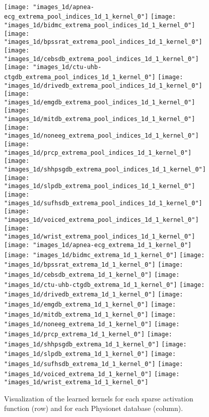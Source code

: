 \documentclass[journal]{IEEEtran}
\begin{document}
\begin{figure*}[!t]
	\\
	\texttt{[image: "images\_1d/apnea-ecg\_extrema\_pool\_indices\_1d\_1\_kernel\_0"]}
	\texttt{[image: "images\_1d/bidmc\_extrema\_pool\_indices\_1d\_1\_kernel\_0"]}
	\texttt{[image: "images\_1d/bpssrat\_extrema\_pool\_indices\_1d\_1\_kernel\_0"]}
	\texttt{[image: "images\_1d/cebsdb\_extrema\_pool\_indices\_1d\_1\_kernel\_0"]}
	\texttt{[image: "images\_1d/ctu-uhb-ctgdb\_extrema\_pool\_indices\_1d\_1\_kernel\_0"]}
	\texttt{[image: "images\_1d/drivedb\_extrema\_pool\_indices\_1d\_1\_kernel\_0"]}
	\texttt{[image: "images\_1d/emgdb\_extrema\_pool\_indices\_1d\_1\_kernel\_0"]}
	\texttt{[image: "images\_1d/mitdb\_extrema\_pool\_indices\_1d\_1\_kernel\_0"]}
	\texttt{[image: "images\_1d/noneeg\_extrema\_pool\_indices\_1d\_1\_kernel\_0"]}
	\texttt{[image: "images\_1d/prcp\_extrema\_pool\_indices\_1d\_1\_kernel\_0"]}
	\texttt{[image: "images\_1d/shhpsgdb\_extrema\_pool\_indices\_1d\_1\_kernel\_0"]}
	\texttt{[image: "images\_1d/slpdb\_extrema\_pool\_indices\_1d\_1\_kernel\_0"]}
	\texttt{[image: "images\_1d/sufhsdb\_extrema\_pool\_indices\_1d\_1\_kernel\_0"]}
	\texttt{[image: "images\_1d/voiced\_extrema\_pool\_indices\_1d\_1\_kernel\_0"]}
	\texttt{[image: "images\_1d/wrist\_extrema\_pool\_indices\_1d\_1\_kernel\_0"]}
	\\
	\texttt{[image: "images\_1d/apnea-ecg\_extrema\_1d\_1\_kernel\_0"]}
	\texttt{[image: "images\_1d/bidmc\_extrema\_1d\_1\_kernel\_0"]}
	\texttt{[image: "images\_1d/bpssrat\_extrema\_1d\_1\_kernel\_0"]}
	\texttt{[image: "images\_1d/cebsdb\_extrema\_1d\_1\_kernel\_0"]}
	\texttt{[image: "images\_1d/ctu-uhb-ctgdb\_extrema\_1d\_1\_kernel\_0"]}
	\texttt{[image: "images\_1d/drivedb\_extrema\_1d\_1\_kernel\_0"]}
	\texttt{[image: "images\_1d/emgdb\_extrema\_1d\_1\_kernel\_0"]}
	\texttt{[image: "images\_1d/mitdb\_extrema\_1d\_1\_kernel\_0"]}
	\texttt{[image: "images\_1d/noneeg\_extrema\_1d\_1\_kernel\_0"]}
	\texttt{[image: "images\_1d/prcp\_extrema\_1d\_1\_kernel\_0"]}
	\texttt{[image: "images\_1d/shhpsgdb\_extrema\_1d\_1\_kernel\_0"]}
	\texttt{[image: "images\_1d/slpdb\_extrema\_1d\_1\_kernel\_0"]}
	\texttt{[image: "images\_1d/sufhsdb\_extrema\_1d\_1\_kernel\_0"]}
	\texttt{[image: "images\_1d/voiced\_extrema\_1d\_1\_kernel\_0"]}
	\texttt{[image: "images\_1d/wrist\_extrema\_1d\_1\_kernel\_0"]}
	\caption{Visualization of the learned kernels for each sparse activation function (row) and for each Physionet database (column).
	}
	\label{fig:kernelvisualization}
\end{figure*}
\end{document}
